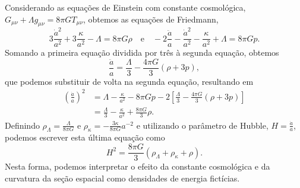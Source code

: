 Considerando as equações de Einstein com constante cosmológica, \(G_{\mu\nu} + \Lambda g_{\mu\nu} = 8\pi G T_{\mu\nu}\), obtemos as equações de Friedmann,
\begin{equation*}
    3\frac{\dot{a}^2}{a^2} + 3\frac{\kappa}{a^2} - \Lambda = 8 \pi G \rho\quad\text{e}\quad -2\frac{\ddot{a}}{a} - \frac{\dot{a}^2}{a^2} - \frac{\kappa}{a^2} + \Lambda = 8\pi G p.
\end{equation*}
Somando a primeira equação dividida por três à segunda equação, obtemos
\begin{equation*}
    \frac{\ddot{a}}{a} = \frac{\Lambda}{3}-\frac{4\pi G}{3} (\rho + 3p),
\end{equation*}
que podemos substituir de volta na segunda equação, resultando em
\begin{align*}
    \left(\frac{\dot{a}}{a}\right)^2 &= \Lambda - \frac{\kappa}{a^2} - 8\pi G p - 2\left[\frac{\Lambda}{3}-\frac{4\pi G}{3} (\rho + 3p)\right]\\
                                     &= \frac{\Lambda}{3} - \frac{\kappa}{a^2} + \frac{8\pi G }{3} \rho.
\end{align*}
Definindo \(\rho_{\Lambda} = \frac{\Lambda}{8\pi G}\) e \(\rho_{\kappa} = -\frac{3 \kappa}{8\pi G} a^{-2}\) e utilizando o parâmetro de Hubble, \(H = \frac{\dot{a}}{a}\), podemos escrever esta última equação como
\begin{equation*}
    H^2 = \frac{8\pi G}{3} \left(\rho_{\Lambda} + \rho_{\kappa} + \rho\right).
\end{equation*}
Nesta forma, podemos interpretar o efeito da constante cosmológica e da curvatura da seção espacial como densidades de energia fictícias.

